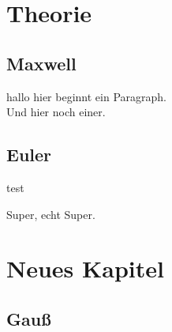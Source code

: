 \documentclass[12pt, twoside, 
               a4paper,
               open=any,
               titlepage,
               bibliography=totoc,
               xcolor=dvipsnames,
               ]{scrbook}
\begin{document}
    \tableofcontents

    \clearpage

    \listoffigures

    \clearpage

    \listoftables

    \chapter{Theorie}
    \section{Maxwell}
    hallo hier beginnt ein Paragraph.\\
    Und hier noch einer.

    \newpage
    \section{Euler}
    test
    \newpage

    Super, echt Super.

    \newpage

    \chapter{Neues Kapitel}
    \section{Gauß}

    \cite{elk}

    \FloatBarrier
    \clearpage
    \printbibliography

    \FloatBarrier
    \clearpage

    \setcounter{tocdepth}{1}
    \setcounter{table}{0}
    \setcounter{equation}{0}
    \setcounter{figure}{0}
    


    
\end{document}

